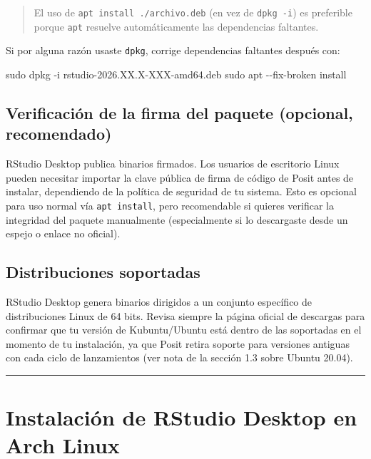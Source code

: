 \documentclass[
  man,
  floatsintext,
  longtable,
  a4paper,
  nolmodern,
  notxfonts,
  notimes,
  12pt,
  colorlinks=true,linkcolor=blue,citecolor=blue,urlcolor=blue]{apa7}
\newenvironment{Shaded}{\begin{snugshade}}{\end{snugshade}}
\newcommand{\AttributeTok}[1]{\textcolor[rgb]{0.40,0.45,0.13}{#1}}
\newcommand{\FunctionTok}[1]{\textcolor[rgb]{0.28,0.35,0.67}{#1}}
\newcommand{\NormalTok}[1]{\textcolor[rgb]{0.00,0.23,0.31}{#1}}
\begin{document}
\begin{quote}
El uso de \texttt{apt\ install\ ./archivo.deb} (en vez de
\texttt{dpkg\ -i}) es preferible porque \texttt{apt} resuelve
automáticamente las dependencias faltantes.
\end{quote}

Si por alguna razón usaste \texttt{dpkg}, corrige dependencias faltantes
después con:

\begin{Shaded}
\begin{Highlighting}[]
\FunctionTok{sudo}\NormalTok{ dpkg }\AttributeTok{{-}i}\NormalTok{ rstudio{-}2026.XX.X{-}XXX{-}amd64.deb}
\FunctionTok{sudo}\NormalTok{ apt }\AttributeTok{{-}{-}fix{-}broken}\NormalTok{ install}
\end{Highlighting}
\end{Shaded}

\subsection{Verificación de la firma del paquete (opcional,
recomendado)}\label{verificaciuxf3n-de-la-firma-del-paquete-opcional-recomendado}

RStudio Desktop publica binarios firmados. Los usuarios de escritorio
Linux pueden necesitar importar la clave pública de firma de código de
Posit antes de instalar, dependiendo de la política de seguridad de tu
sistema. Esto es opcional para uso normal vía \texttt{apt\ install},
pero recomendable si quieres verificar la integridad del paquete
manualmente (especialmente si lo descargaste desde un espejo o enlace no
oficial).

\subsection{Distribuciones soportadas}\label{distribuciones-soportadas}

RStudio Desktop genera binarios dirigidos a un conjunto específico de
distribuciones Linux de 64 bits. Revisa siempre la página oficial de
descargas para confirmar que tu versión de Kubuntu/Ubuntu está dentro de
las soportadas en el momento de tu instalación, ya que Posit retira
soporte para versiones antiguas con cada ciclo de lanzamientos (ver nota
de la sección 1.3 sobre Ubuntu 20.04).

\begin{center}\rule{0.5\linewidth}{0.5pt}\end{center}

\section{Instalación de RStudio Desktop en Arch
Linux}\label{instalaciuxf3n-de-rstudio-desktop-en-arch-linux}
\end{document}
